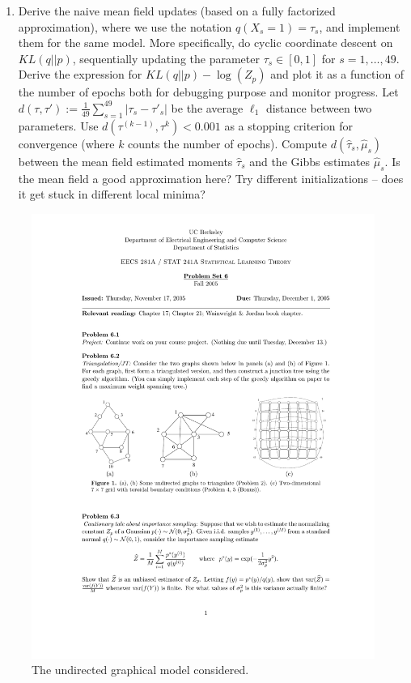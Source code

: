 \documentclass[12pt]{article}
\newcommand{\1}{{\bf 1}}
\begin{document}
\begin{enumerate}
\begin{enumerate}
\item Derive the naive mean field updates (based on a fully factorized approximation), where we use the notation $q(X_s =1) = \tau_s$, and implement them for the same model. More specifically, do cyclic coordinate descent on $KL(q || p)$, sequentially updating the parameter $\tau_s \in [0,1]$ for $s=1, \ldots, 49$. Derive the expression for $KL(q || p)-\log(Z_p)$ and plot it as a function of the number of epochs both for debugging purpose and monitor progress. Let $d(\tau, \tau'):= \frac{1}{49} \sum_{s=1}^{49} |\tau_s - \tau'_s|$ be the average $\ell_1$ distance between two parameters. Use $d(\tau^{(k-1)}, \tau^{k}) <  0.001$ as a stopping criterion for convergence (where $k$ counts the number of epochs). Compute $d(\hat{\tau}_s, \hat{\mu}_s)$ between the mean field estimated moments $\hat{\tau}_s$ and the Gibbs estimates $\hat{\mu}_s$.  Is the mean field a good approximation here? Try different initializations -- does it get stuck in different local minima?

\end{enumerate}

\begin{figure}
\centering
\includegraphics[scale=1.5]{grid.pdf}
\caption{The undirected graphical model considered. \label{fig:grid}}
\end{figure}

\end{enumerate}
\end{document}
